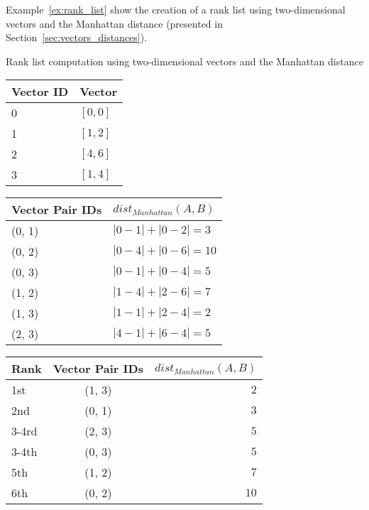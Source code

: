 Example~\ref{ex:rank_list} show the creation of a rank list using two-dimensional vectors and the Manhattan distance (presented in Section~\ref{sec:vectors_distances}).

\begin{example}
  \centering
  \caption{Rank list computation using two-dimensional vectors and the Manhattan distance}
  \label{ex:rank_list}

  \begin{subexample}{\linewidth}
    \centering
    \begin{tabular}{l l}
      \toprule
      Vector ID & Vector \\
      \midrule
      0 & $[0, 0]$ \\
      1 & $[1, 2]$ \\
      2 & $[4, 6]$ \\
      3 & $[1, 4]$ \\
      \bottomrule
    \end{tabular}
  \end{subexample}

  \vspace{0.5cm}

  \begin{subexample}{\linewidth}
    \centering
    \begin{tabular}{l l}
      \toprule
      Vector Pair IDs & $dist_{Manhattan}(A, B)$ \\
      \midrule
      (0, 1) & $|0-1| + |0-2| = 3$ \\
      (0, 2) & $|0-4| + |0-6| = 10$ \\
      (0, 3) & $|0-1| + |0-4| = 5$ \\
      (1, 2) & $|1-4| + |2-6| = 7$ \\
      (1, 3) & $|1-1| + |2-4| = 2$ \\
      (2, 3) & $|4-1| + |6-4| = 5$ \\
      \bottomrule
    \end{tabular}
  \end{subexample}

  \vspace{0.5cm}

  \begin{subexample}{\linewidth}
    \centering
    \begin{tabular}{l c r}
      \toprule
      Rank & Vector Pair IDs & $dist_{Manhattan}(A, B)$ \\
      \midrule
      1st   & (1, 3) & $2$ \\
      2nd   & (0, 1) & $3$ \\
      3-4rd & (2, 3) & $5$ \\
      3-4th & (0, 3) & $5$ \\
      5th   & (1, 2) & $7$ \\
      6th   & (0, 2) & $10$ \\
      \bottomrule
    \end{tabular}
  \end{subexample}
\end{example}

